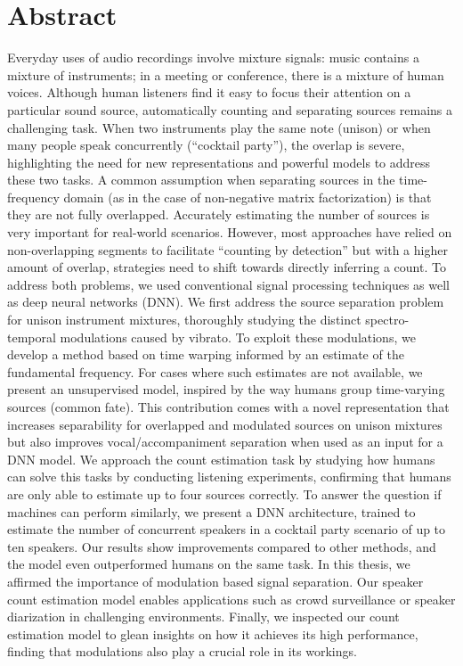 \begingroup
\let\clearpage\relax
\let\cleardoublepage\relax
\let\cleardoublepage\relax

\chapter*{Abstract}
Everyday uses of audio recordings involve mixture signals: music contains a mixture of instruments; in a meeting or conference, there is a mixture of human voices.
Although human listeners find it easy to focus their attention on a particular sound source, automatically counting and separating sources remains a challenging task.
When two instruments play the same note (unison) or when many people speak concurrently (``cocktail party''), the overlap is severe, highlighting the need for new representations and powerful models to address these two tasks.
A common assumption when separating sources in the time-frequency domain (as in the case of non-negative matrix factorization) is that they are not fully overlapped.
Accurately estimating the number of sources is very important for real-world scenarios.
However, most approaches have relied on non-overlapping segments to facilitate ``counting by detection'' but with a higher amount of overlap, strategies need to shift towards directly inferring a count.
To address both problems, we used conventional signal processing techniques as well as deep neural networks (DNN).
We first address the source separation problem for unison instrument mixtures, 
thoroughly studying the distinct spectro-temporal modulations caused by vibrato. 
To exploit these modulations, we develop a method based on time warping informed by an estimate of the fundamental frequency. 
For cases where such estimates are not available, we present an unsupervised model, inspired by the way humans group time-varying sources (common fate).
This contribution comes with a novel representation that increases separability for overlapped and modulated sources on unison mixtures but also improves vocal/accompaniment separation when used as an input for a DNN model.
We approach the count estimation task by studying how humans can solve this tasks by conducting listening experiments, confirming that humans are only able to estimate up to four sources correctly.
To answer the question if machines can perform similarly, we present a DNN architecture, trained to estimate the number of concurrent speakers in a cocktail party scenario of up to ten speakers.
Our results show improvements compared to other methods, and the model even outperformed humans on the same task.
In this thesis, we affirmed the importance of modulation based signal separation. 
Our speaker count estimation model enables applications such as crowd surveillance or speaker diarization in challenging environments.
Finally, we inspected our count estimation model to glean insights on how it achieves its high performance, finding that modulations also play a crucial role in its workings.

